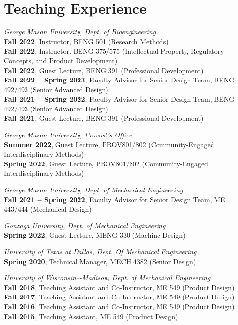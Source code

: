 \documentclass[letterpaper, 10pt]{article}
\begin{document}
\section{Teaching Experience}

\textit{George Mason University, Dept. of Bioengineering}\\
\textbf{Fall 2022}, Instructor, BENG 501 (Research Methods)\\
\textbf{Fall 2022}, Instructor, BENG 375/575 (Intellectual Property, Regulatory Concepts, and Product Development)\\
\textbf{Fall 2022}, Guest Lecture, BENG 391 (Professional Development)\\
\textbf{Fall 2022 -- Spring 2023}, Faculty Advisor for Senior Design Team, BENG 492/493 (Senior Advanced Design)\\ 
\textbf{Fall 2021 -- Spring 2022}, Faculty Advisor for Senior Design Team, BENG 492/493 (Senior Advanced Design)\\ 
\textbf{Fall 2021}, Guest Lecture, BENG 391 (Professional Development)

\bigskip

\textit{George Mason University, Provost’s Ofﬁce}\\
\textbf{Summer 2022}, Guest Lecture, PROV801/802 (Community-Engaged Interdisciplinary Methods)\\
\textbf{Spring 2022}, Guest Lecture, PROV801/802 (Community-Engaged Interdisciplinary Methods)

\bigskip

\textit{George Mason University, Dept. of Mechanical Engineering}\\
\textbf{Fall 2021 -- Spring 2022}, Faculty Advisor for Senior Design Team, ME 443/444 (Mechanical Design)

\bigskip

\textit{Gonzaga University, Dept. of Mechanical Engineering}\\
\textbf{Spring 2022}, Guest Lecture, MENG 330 (Machine Design)

\bigskip

\textit{University of Texas at Dallas, Dept. Of Mechanical Engineering}\\
\textbf{Spring 2020}, Technical Manager, MECH 4382 (Senior Design)

\bigskip

\textit{University of Wisconsin–-Madison, Dept. of Mechanical Engineering}\\
\textbf{Fall 2018}, Teaching Assistant and Co-Instructor, ME 549 (Product Design)\\
\textbf{Fall 2017}, Teaching Assistant and Co-Instructor, ME 549 (Product Design)\\ 
\textbf{Fall 2016}, Teaching Assistant and Co-Instructor, ME 549 (Product Design)\\ 
\textbf{Fall 2015}, Teaching Assistant, ME 549 (Product Design)
\end{document}
